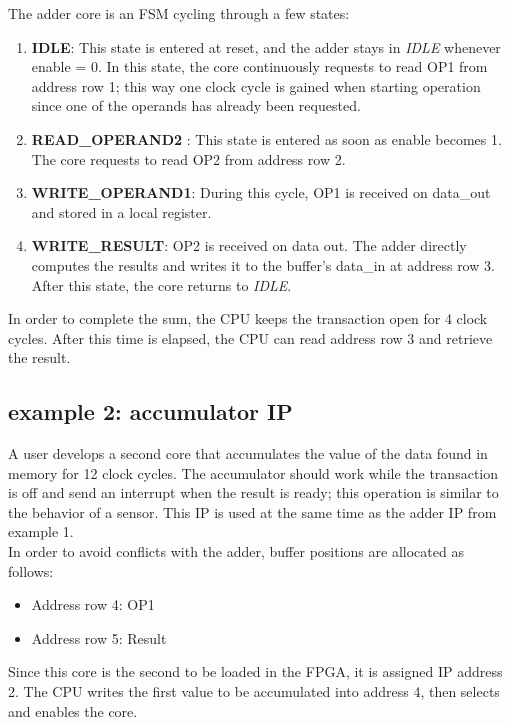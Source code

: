 The adder core is an FSM cycling through a few states:
\begin{enumerate}
	\item \textbf{IDLE}: This state is entered at reset, and the adder stays in \textit{IDLE} whenever enable = 0. In this state, the core continuously requests to read OP1 from address row 1; this way one clock cycle is gained when starting operation since one of the operands has already been requested.

	\item \textbf{READ\_OPERAND2} : This state is entered as soon as enable becomes 1. The core requests to read OP2 from address row 2.

	\item\textbf{ WRITE\_OPERAND1}: During this cycle, OP1 is received on data\_out and stored in a local register.

	\item \textbf{WRITE\_RESULT}: OP2 is received on data out. The adder directly computes the results and writes it to the buffer's data\_in at address row 3. After this state, the core returns to \textit{IDLE}.
\end{enumerate}
In order to complete the sum, the CPU keeps the transaction open for 4 clock cycles. After this time is elapsed, the CPU can read address row 3 and retrieve the result. 

\subsection{example 2: accumulator IP}

A user develops a second core that accumulates the value of the data found in memory for 12 clock cycles. The accumulator should work while the transaction is off and send an interrupt when the result is ready; this operation is similar to the behavior of a sensor. This IP is used at the same time as the adder IP from example 1.\\
In order to avoid conflicts with the adder, buffer positions are allocated as follows:

\begin{itemize}
\item Address row 4: OP1 
\item Address row 5: Result
\end{itemize}


Since this core is the second to be loaded in the FPGA, it is assigned IP address 2. The CPU writes the first value to be accumulated into address 4, then selects and enables the core. \\
\bigskip

